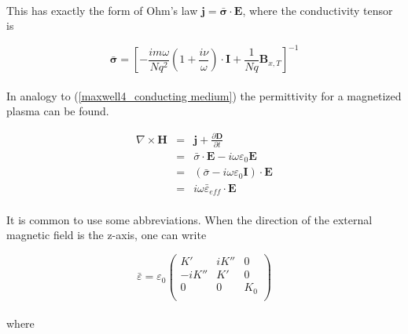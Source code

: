 \documentclass[a4paper,10pt]{thesis}
\begin{document}
\paragraph*{}
This has exactly the form of Ohm's law $\mathbf{j}= \mathbf{\bar{\sigma}} \cdot \mathbf{E}$, where the conductivity tensor is

\begin{equation}\label{conductivity_magnetoplasma}
    \mathbf{\bar{\sigma}} = \left[- \frac{i m \omega }{Nq^2} \left( 1   +  \frac{i \nu}{ \omega}\right) \cdot \mathbf{I}+\frac{1}{Nq} \mathbf{B}_{x,T} \right]^{-1}
\end{equation}

\paragraph*{}
In analogy to (\ref{maxwell4_conducting medium}) the permittivity for a magnetized plasma can be found.

\begin{eqnarray}
\nabla \times \mathbf{H}&=&\mathbf{j}+ \frac{\partial \mathbf{D}}{\partial t} \label{maxwell4_magnetized_plasma}\\
&=&\bar{\sigma} \cdot \mathbf{E}- i \omega \varepsilon_0 \mathbf{E} \nonumber \\
&=&( \bar{\sigma} -  i \omega \varepsilon_0 \mathbf{I} )\cdot \mathbf{E} \nonumber \\
&=&i \omega \bar{\varepsilon}_{eff}\cdot \mathbf{E} \nonumber
\end{eqnarray}

\paragraph*{}
It is common to use some abbreviations. When the direction of the external magnetic field is the z-axis, one can write

\begin{equation}\label{gyrotropic_tensor}
    \bar{\varepsilon}=\varepsilon_0\left(%
\begin{array}{ccc}
  K' & iK'' & 0 \\
-iK'' & K' & 0 \\
0 & 0 & K_0 \\\end{array}%
\right)
\end{equation}

\paragraph*{}
where
\end{document}
